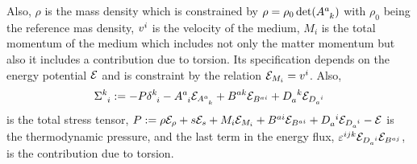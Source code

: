 \documentclass[
10pt, %
a4paper, %
oneside, %
headinclude,footinclude, %
table
]{scrartcl}
\begin{document}
Also, $ \rho $ is the mass density which is constrained by $ \rho = \rho_0 
\det(\dist{a}{k}) $ with $ \rho_0 $ being the reference mas density, $ v^{i} 
$ is the velocity 
of the medium, $ 
M_i $ is the total momentum 
of the medium which includes not only the 
matter momentum but also it includes a contribution due to 
torsion. Its specification depends on the energy potential $ \mathcal{E} $ and is
constraint by the relation $ \mathcal{E}_{M_i} = v^{i} $. Also, 
\begin{equation}\label{stress}
\Stress{k}{i} := -
P \kronecker{k}{i} - \dist{a}{i} \calE_{\dist{a}{k}} + 
\burg{a}{k} 
\calE_{\burg{a}{i}} + \durg{a}{k}\calE_{\durg{a}{i}}  
\end{equation}is the total stress 
tensor, $ P := \rho \calE_\rho + s\calE_s + M_i \calE_{M_i} + 
\burg{a}{i}\calE_{\burg{a}{i}} + 
\durg{a}{i}
\calE_{\durg{a}{i}} - \calE $ is the thermodynamic pressure, and the last term 
in the energy flux, $ \LeviCivitaUp{ijk} 
\calE_{\durg{a}{i}}\calE_{\burg{a}{j}} $, is the contribution due 
to torsion.
\end{document}
